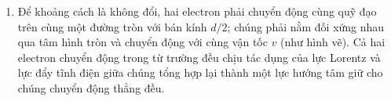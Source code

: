 \begin{loigiai}
    \begin{enumerate}[1)]
        \item Để khoảng cách là không đổi, hai electron phải chuyển động cùng quỹ đạo trên cùng một đường tròn với bán kính $d/2$; chúng phải nằm đối xứng nhau qua tâm hình tròn và chuyển động với cùng vận tốc $v$ (như hình vẽ). Cả hai electron chuyển động trong từ trường đều chịu tác dụng của lực Lorentz và lực đẩy tĩnh điện giữa chúng tổng hợp lại thành một lực hướng tâm giữ cho chúng chuyển động thẳng đều.
        \begin{center}
            \begin{tikzpicture}[x=0.75pt,y=0.75pt,yscale=-1,xscale=1]
            

\end{tikzpicture}
\end{center}
\end{enumerate}
\end{loigiai}
